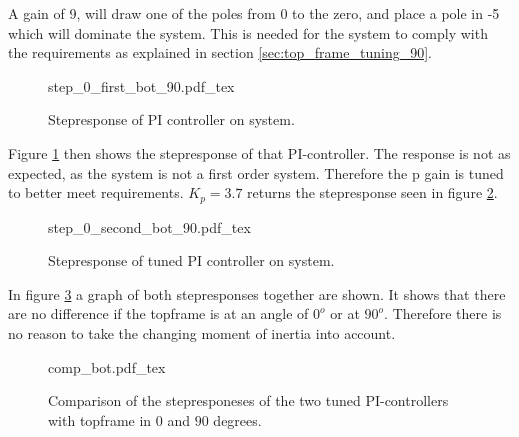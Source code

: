 \documentclass[../../../Main]{subfiles}
\begin{document}
A gain of 9, will draw one of the poles from $0$ to the zero, and place a pole in -5 which will dominate the system. This is needed for the system to comply with the requirements as explained in section \ref{sec:top_frame_tuning_90}.

\begin{figure}[H]
\centering
\def\svgwidth{\textwidth}
{step_0_first_bot_90.pdf_tex}
\caption{Stepresponse of PI controller on system.}
\label{fig:step_0_first_bot_90}
\end{figure}

Figure \ref{fig:step_0_first_bot_90} then shows the stepresponse of that PI-controller.
The response is not as expected, as the system is not a first order system. Therefore the p gain is tuned to better meet requirements. $K_p = 3.7$ returns the stepresponse seen in figure \ref{fig:step_0_second_bot_90}.

\begin{figure}[H]
\centering
\def\svgwidth{\textwidth}
{step_0_second_bot_90.pdf_tex}
\caption{Stepresponse of tuned PI controller on system.}
\label{fig:step_0_second_bot_90}
\end{figure}

In figure \ref{fig:comp_bot} a graph of both stepresponses together are shown. It shows that there are no difference if the topframe is at an angle of $0^o$ or at $90^o$. Therefore there is no reason to take the changing moment of inertia into account. 


\begin{figure}[H]
\centering
\def\svgwidth{\textwidth}
{comp_bot.pdf_tex}
\caption{Comparison of the stepresponeses of the two tuned PI-controllers with topframe in $0$ and $90$ degrees.}
\label{fig:comp_bot}
\end{figure}
\end{document}

